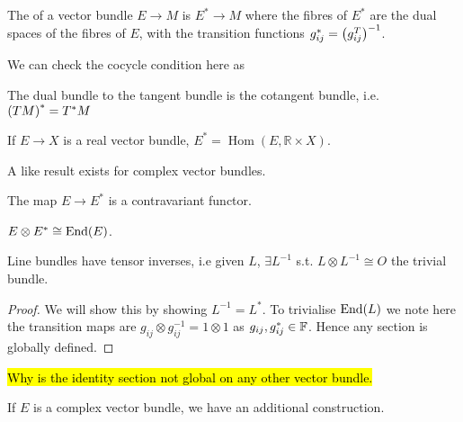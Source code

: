 \documentclass{article}
\begin{document}
\begin{definition}
	The  of a vector bundle $E \to M$ is $E^\ast \to M$ where the fibres of $E^\ast$ are the dual spaces of the fibres of $E$, with the transition functions $g_{ij}^\ast = \left( g_{ij}^T \right)^{-1}$.
\end{definition}

\begin{remark}
	We can check the cocycle condition here as 
\end{remark}

\begin{example}
	The dual bundle to the tangent bundle is the cotangent bundle, i.e. $\left( TM \right)^\ast = T^\ast M$
\end{example}

\begin{prop}
	If $E \to X$ is a real vector bundle, $E^\ast = \operatorname{Hom}(E, \mathbb{R} \times X)$. 
\end{prop}
\begin{remark}
	A like result exists for complex vector bundles. 
\end{remark}
\begin{corollary}
	The map $E \to E^\ast$ is a contravariant functor. 
\end{corollary}

\begin{lemma}
	$E \otimes E^\ast \cong \operatorname{End}(E)$. 
\end{lemma}

\begin{lemma}
	Line bundles have tensor inverses, i.e given $L$, $\exists L^{-1}$ s.t. $L \otimes L^{-1} \cong O$ the trivial bundle. 
\end{lemma}
\begin{proof}
	We will show this by showing $L^{-1} = L^\ast$. To trivialise $\operatorname{End}(L)$ we note here the transition maps are $g_{ij} \otimes g_{ij}^{-1} =  1 \otimes 1$ as $g_{ij}, g_{ij}^\ast \in \mathbb{F}$. Hence any section is globally defined. 
\end{proof}

\begin{remark}
	\hl{Why is the identity section not global on any other vector bundle.}
\end{remark}

If $E$ is a complex vector bundle, we have an additional construction. 
\end{document}
